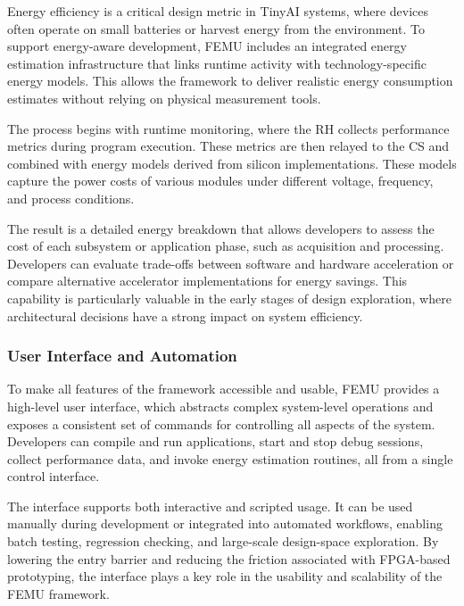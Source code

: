                 Energy efficiency is a critical design metric in TinyAI systems, where devices often operate on small batteries or harvest energy from the environment. To support energy-aware development, \mbox{FEMU} includes an integrated energy estimation infrastructure that links runtime activity with technology-specific energy models. This allows the framework to deliver realistic energy consumption estimates without relying on physical measurement tools.
                
                The process begins with runtime monitoring, where the RH collects performance metrics during program execution. These metrics are then relayed to the CS and combined with energy models derived from silicon implementations. These models capture the power costs of various modules under different voltage, frequency, and process conditions.
                
                The result is a detailed energy breakdown that allows developers to assess the cost of each subsystem or application phase, such as acquisition and processing. Developers can evaluate trade-offs between software and hardware acceleration or compare alternative accelerator implementations for energy savings. This capability is particularly valuable in the early stages of design exploration, where architectural decisions have a strong impact on system efficiency.
            
            \subsubsection{User Interface and Automation}
            
                To make all features of the framework accessible and usable, \mbox{FEMU} provides a high-level user interface, which abstracts complex system-level operations and exposes a consistent set of commands for controlling all aspects of the system. Developers can compile and run applications, start and stop debug sessions, collect performance data, and invoke energy estimation routines, all from a single control interface.
                
                The interface supports both interactive and scripted usage. It can be used manually during development or integrated into automated workflows, enabling batch testing, regression checking, and large-scale design-space exploration. By lowering the entry barrier and reducing the friction associated with FPGA-based prototyping, the interface plays a key role in the usability and scalability of the \mbox{FEMU} framework.


